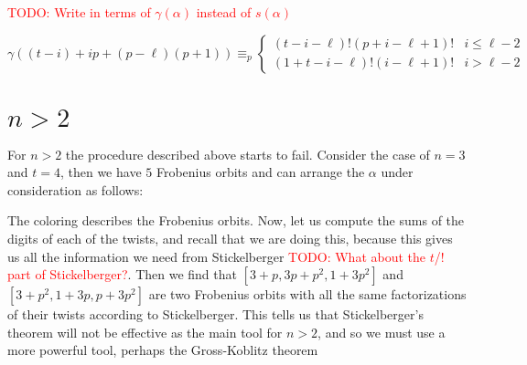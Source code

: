 \documentclass[12pt]{article}
\theoremstyle{customtheorem}%
\theoremstyle{remark}
\theoremstyle{definition}
\numberwithin{equation}{section}
\numberwithin{theorem}{section}
\begin{document}
\textcolor{red}{TODO: Write in terms of $\gamma(\alpha)$ instead of $s(\alpha)$}

\[ \gamma((t-i)+ip + (p - \ell)(p+1)) \equiv_p \begin{cases} (t-i-\ell)!(p+i-\ell+1)! & i \leq \ell -2 \\ (1+t-i-\ell)!(i-\ell+1)!& i > \ell -2 \end{cases}\]

\section{$n>2$}

For $n > 2$ the procedure described above starts to fail. 
Consider the case of $n = 3$ and $t = 4$, then we have $5$ Frobenius orbits and can arrange the $\alpha$ under consideration as follows:

The coloring describes the Frobenius orbits. 
Now, let us compute the sums of the digits of each of the twists, and recall that we are doing this, because this gives us all the information we need from Stickelberger \textcolor{red}{TODO: What about the $t$/$!$ part of Stickelberger?}. 
Then we find that $[3+p,3p+p^2,1+3p^2]$ and $[3+p^2, 1+3p, p+3p^2]$ are two Frobenius orbits with all the same factorizations of their twists according to Stickelberger. 
This tells us that Stickelberger's theorem will not be effective as the main tool for $n > 2$, and so we must use a more powerful tool, perhaps the Gross-Koblitz theorem

%
%
\end{document}
